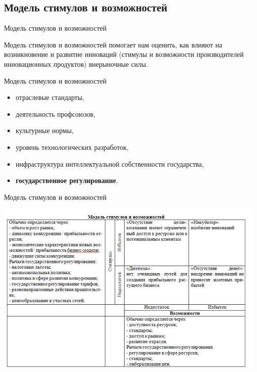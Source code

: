 \documentclass[_Venture_p3.tex]{subfiles}
\begin{document}
\subsection{Модель стимулов и возможностей}
\begin{frame}{Модель стимулов и возможностей}
\begin{block}{Модель стимулов и возможностей }
	\quad помогает нам оценить, как влияют на возникновение и развитие инноваций (стимулы и возможности производителей инновационных продуктов) внерыночные силы.
\end{block}
\end{frame}

\begin{frame}{Модель стимулов и возможностей}
\begin{itemize}
	\item отраслевые стандарты, 
	\item деятельность профсоюзов, 
	\item культурные нормы, 
	\item уровень технологических разработок, 
	\item инфраструктура интеллектуальной собственности государства, \item \textbf{государственное регулирование}.
\end{itemize}
\end{frame}


\begin{frame}{Модель стимулов и возможностей}
\begin{table}
	\centering
	\caption{Стимулы и возможности}
	\includegraphics[scale=.45]{img/stimul_possibility_model}
\end{table}
\end{frame}
\end{document}
